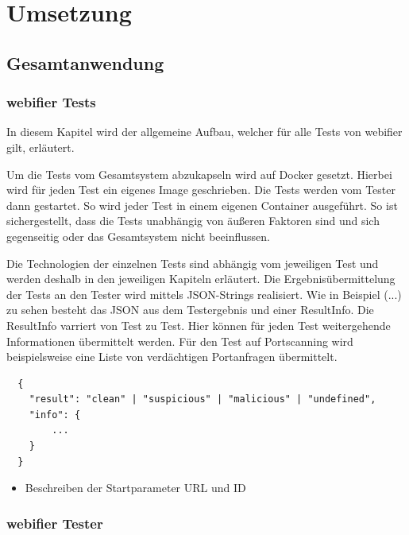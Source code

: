 \chapter{Umsetzung}

\section{Gesamtanwendung}


\subsection{webifier Tests}
In diesem Kapitel wird der allgemeine Aufbau, welcher für alle Tests von webifier gilt, erläutert.

Um die Tests vom Gesamtsystem abzukapseln wird auf Docker gesetzt. Hierbei wird für jeden Test ein eigenes Image geschrieben. Die Tests werden vom Tester dann gestartet. So wird jeder Test in einem eigenen Container ausgeführt. So ist sichergestellt, dass die Tests unabhängig von äußeren Faktoren sind und sich gegenseitig oder das Gesamtsystem nicht beeinflussen.

Die Technologien der einzelnen Tests sind abhängig vom jeweiligen Test und werden deshalb in den jeweiligen Kapiteln erläutert. Die Ergebnisübermittelung der Tests an den Tester wird mittels JSON-Strings realisiert. Wie in Beispiel (...) zu sehen besteht das JSON aus dem Testergebnis und einer ResultInfo. Die ResultInfo varriert von Test zu Test. Hier können für jeden Test weitergehende Informationen übermittelt werden. Für den Test auf Portscanning wird beispielsweise eine Liste von verdächtigen Portanfragen übermittelt.

\begin{scriptsize}
\begin{lstlisting}
  {
  	"result": "clean" | "suspicious" | "malicious" | "undefined",
  	"info": {
  		...
  	}
  }
\end{lstlisting}
\end{scriptsize}

\begin{itemize}
  \item Beschreiben der Startparameter URL und ID
\end{itemize}

\subsection{webifier Tester}

